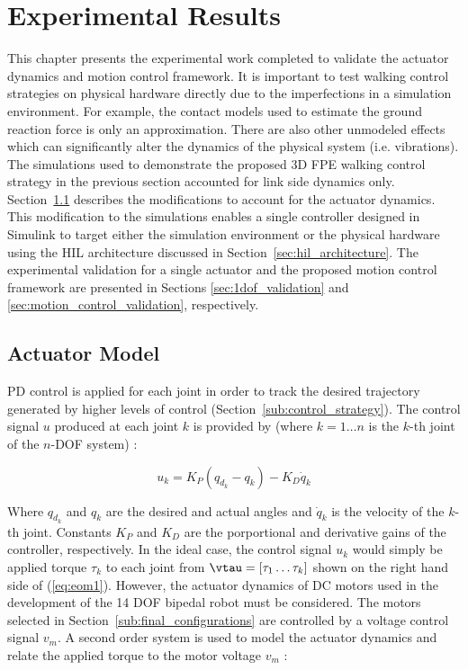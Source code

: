 \chapter{Experimental Results} %
\label{cha:experiments}

This chapter presents the experimental work completed to validate the actuator dynamics and motion control framework. It is important to test walking control strategies on physical hardware directly due to the imperfections in a simulation environment. For example, the contact models used to estimate the ground reaction force is only an approximation. There are also other unmodeled effects which can significantly alter the dynamics of the physical system (i.e. vibrations). The simulations used to demonstrate the proposed 3D FPE walking control strategy in the previous section accounted for link side dynamics only. Section~\ref{sec:actuator_model} describes the modifications to account for the actuator dynamics. This modification to the simulations enables a single controller designed in Simulink to target either the simulation environment or the physical hardware using the HIL architecture discussed in Section~\ref{sec:hil_architecture}. The experimental validation for a single actuator and the proposed motion control framework are presented in Sections \ref{sec:1dof_validation} and \ref{sec:motion_control_validation}, respectively. 

\section{Actuator Model} %
\label{sec:actuator_model}
PD control is applied for each joint in order to track the desired trajectory generated by higher levels of control (Section~\ref{sub:control_strategy}). The control signal $u$ produced at each joint $k$ is provided by (where $k = 1 \ldots n$ is the $k$-th joint of the $n$-DOF system) : 

\begin{equation}
	{u_k} = {K_P}({q_{d_k}} - {q_k}) - {K_D}{\dot q_k}
	\label{eq:pdcontrollaw}
\end{equation} 

Where ${q_{d_k}}$ and ${q_k}$ are the desired and actual angles and ${\dot q_k}$ is the velocity of the $k$-th joint. Constants ${K_P}$ and ${K_D}$ are the porportional and derivative gains of the controller, respectively. In the ideal case, the control signal ${u_k}$ would simply be applied torque ${\tau _k}$ to each joint from $\vtau = \left[\tau _1 \ldots \tau _k \right]$ shown on the right hand side of (\ref{eq:eom1}). However, the actuator dynamics of DC motors used in the development of the 14 DOF bipedal robot must be considered. The motors selected in Section~\ref{sub:final_configurations} are controlled by a voltage control signal $v_{m}$. A second order system is used to model the actuator dynamics and relate the applied torque to the motor voltage $v _m$ \cite{Spong2008}: 

